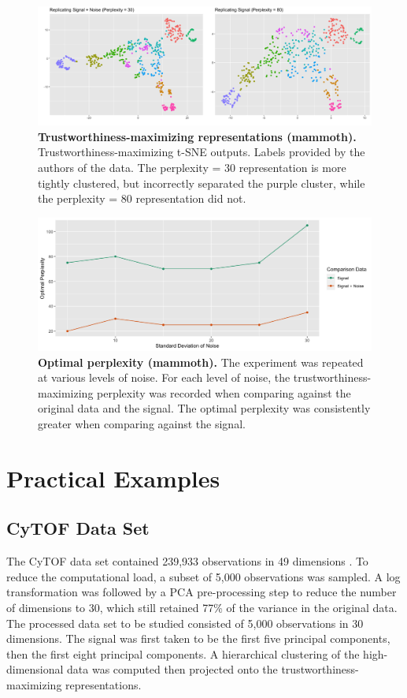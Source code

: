 \documentclass{article}
\begin{document}
\begin{figure}[H]
\centering
\includegraphics[scale=1.05]{Fig S5}
\caption{{\bf Trustworthiness-maximizing representations (mammoth).}
Trustworthiness-maximizing t-SNE outputs. Labels provided by the authors of the data. The perplexity = 30 representation is more tightly clustered, but incorrectly separated the purple cluster, while the perplexity = 80 representation did not.}
\end{figure}

\begin{figure}[H]
\centering
\includegraphics[scale=1.4]{Fig S6}
\caption{{\bf Optimal perplexity (mammoth).}
The experiment was repeated at various levels of noise. For each level of noise, the trustworthiness-maximizing perplexity was recorded when comparing against the original data and the signal. The optimal perplexity was consistently greater when comparing against the signal.}
\end{figure}

\section{Practical Examples}

\subsection{CyTOF Data Set}
The CyTOF data set contained 239,933 observations in 49 dimensions \cite{CyTOF data}. To reduce the computational load, a subset of 5,000 observations was sampled. A log transformation was followed by a PCA pre-processing step to reduce the number of dimensions to 30, which still retained 77\% of the variance in the original data. The processed data set to be studied consisted of 5,000 observations in 30 dimensions. The signal was first taken to be the first five principal components, then the first eight principal components. A hierarchical clustering of the high-dimensional data was computed then projected onto the trustworthiness-maximizing representations.
\end{document}
